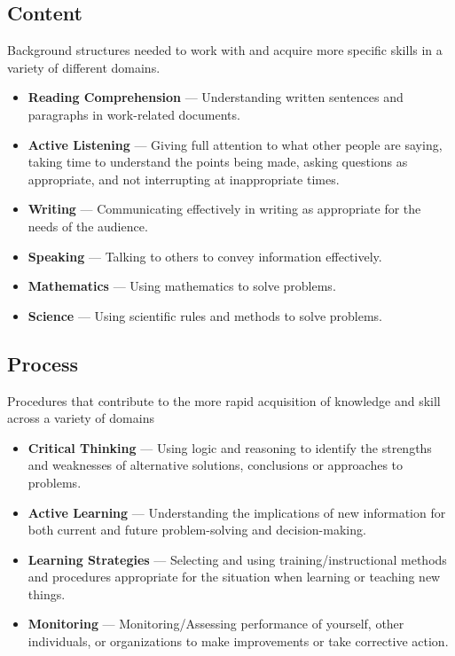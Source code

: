 \documentclass[11pt]{article}
\begin{document}
\subsection*{Content}

Background structures needed to work with and acquire more specific skills in a variety of different domains.

\begin{itemize}
    \item \textbf{Reading Comprehension} — Understanding written sentences and paragraphs in work-related documents.
    \item \textbf{Active Listening} — Giving full attention to what other people are saying, taking time to understand the points being made, asking questions as appropriate, and not interrupting at inappropriate times.
    \item \textbf{Writing} — Communicating effectively in writing as appropriate for the needs of the audience.
    \item \textbf{Speaking} — Talking to others to convey information effectively.
    \item \textbf{Mathematics} — Using mathematics to solve problems.
    \item \textbf{Science} — Using scientific rules and methods to solve problems.
\end{itemize}

\subsection*{Process}

Procedures that contribute to the more rapid acquisition of knowledge and skill across a variety of domains

\begin{itemize}
    \item \textbf{Critical Thinking} — Using logic and reasoning to identify the strengths and weaknesses of alternative solutions, conclusions or approaches to problems.
    \item \textbf{Active Learning} — Understanding the implications of new information for both current and future problem-solving and decision-making.
    \item \textbf{Learning Strategies} — Selecting and using training/instructional methods and procedures appropriate for the situation when learning or teaching new things.
    \item \textbf{Monitoring} — Monitoring/Assessing performance of yourself, other individuals, or organizations to make improvements or take corrective action.
\end{itemize}
\end{document}
